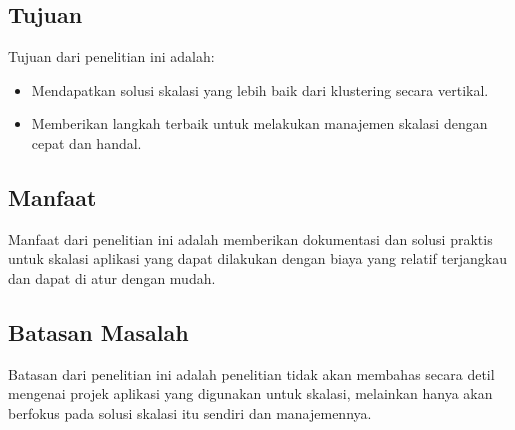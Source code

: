 \subsection{Tujuan}
Tujuan dari penelitian ini adalah:
\begin{itemize}
    \item Mendapatkan solusi skalasi yang lebih baik dari klustering secara vertikal.
    \item Memberikan langkah terbaik untuk melakukan manajemen skalasi dengan cepat dan handal.
\end{itemize}

\subsection{Manfaat}
Manfaat dari penelitian ini adalah memberikan dokumentasi dan solusi praktis untuk skalasi aplikasi yang dapat dilakukan dengan biaya yang relatif terjangkau dan dapat di atur dengan mudah.

\subsection{Batasan Masalah}
Batasan dari penelitian ini adalah penelitian tidak akan membahas secara detil mengenai projek aplikasi yang digunakan untuk skalasi, melainkan hanya akan berfokus pada solusi skalasi itu sendiri dan manajemennya.